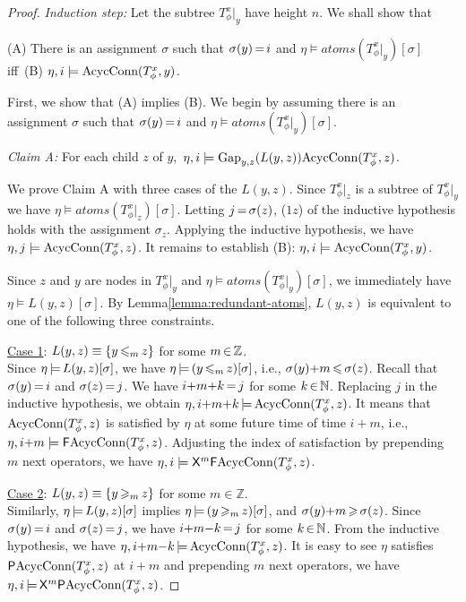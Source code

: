 \begin{proof}
\smallskip

{\em Induction step:}
Let the subtree $T_\phi^x|_y$ have height $n$.
We shall show that

(A) There is an assignment $\sigma$ such that
$\sigma(y)\,{=}\,i$ and
$\eta\models atoms(T_\phi^x|_y)[\sigma]$
\\
iff\,
(B) $\eta,i\models \text{AcycConn}(T_\phi^x,y)$.

\smallskip

First, we show that (A) implies (B).
We begin by
assuming there is an assignment $\sigma$ such that
$\sigma(y)\,{=}\,i$ and
$\eta\models atoms(T_\phi^x|_y)[\sigma]$.

\smallskip

{\sl Claim A:}
For each child $z$ of $y$,\,
$\eta,i\models \text{Gap}_{y,z}(L(y,z))\text{AcycConn}(T_\phi^x,z)$.

We prove Claim A with three cases of the $L(y,z)$.
Since $T_\phi^x|_z$ is a subtree of $T_\phi^x|_y$
we have
$\eta\models atoms(T_\phi^x|_z)[\sigma]$.
Letting $j\,{=}\,\sigma(z)$, ($1z$)
of the inductive hypothesis holds
with the assignment $\sigma_z$.
Applying the inductive hypothesis, 
we have
$\eta,j\models\text{AcycConn}(T_\phi^x,z)$.
It remains to establish (B):
$\eta,i\models\text{AcycConn}(T_\phi^x,y)$.

Since $z$ and $y$ are nodes in $T_\phi^x|_y$ and
$\eta\models atoms(T_\phi^x|_y)[\sigma]$,
we immediately have $\eta\models L(y,z)[\sigma]$.
By Lemma\:\ref{lemma:redundant-atoms},
$L(y,z)$ is equivalent to one of the following three constraints.

\smallskip

\underline{Case 1}:
$L(y,z)\equiv \{y \,{\leqslant_m}\, z\}$ for some $m\,{\in}\,\mathbb{Z}$.
\\
Since $\eta\,{\models}\, L(y,z)[\sigma]$,
we have $\eta\,{\models}\, (y\,{\leqslant_m}\, z)[\sigma]$,
i.e.,
$\sigma(y) {+} m \,{\leqslant}\, \sigma(z)$.
Recall that $\sigma(y)\,{=}\,i$ and $\sigma(z)\,{=}\,j$.
We have $i{+}m{+}k\,{=}\,j$ for some $k\,{\in}\,\mathbb{N}$.
Replacing $j$ in the inductive hypothesis,
we obtain $\eta, i{+}m{+}k \,{\models}\, \text{AcycConn}(T_\phi^x,z)$.
It means that $\text{AcycConn}(T_\phi^x,z)$ is satisfied
by $\eta$ at some future time of time $i{+}m$,
i.e.,
$\eta,i{+}m\models {\sf F}\text{AcycConn}(T_\phi^x,z)$.
Adjusting the index of satisfaction by prepending $m$ next operators,
we have $\eta,i\models {\sf X}^{m}{\sf F}\text{AcycConn}(T_\phi^x,z)$.

\smallskip

\underline{Case 2}:
$L(y,z)\equiv \{y \,{\geqslant_m}\, z\}$ for some $m\in\mathbb{Z}$.
\\
Similarly, $\eta\,{\models}\, L(y,z)[\sigma]$ implies
$\eta\,{\models}\, (y \,{\geqslant_m}\, z)[\sigma]$, and
$\sigma(y) {+} m \,{\geqslant}\, \sigma(z)$.
Since $\sigma(y)\,{=}\,i$ and $\sigma(z)\,{=}\,j$,
we have $i{+}m{-}k\,{=}\,j$ for some $k\,{\in}\,\mathbb{N}$.
From the inductive hypothesis,
we have
$\eta, i{+}m{-}k \,{\models}\, \text{AcycConn}(T_\phi^x,z)$.
It is easy to see
$\eta$ satisfies ${\sf P}\text{AcycConn}(T_\phi^x,z)$ at $i{+}m$
and prepending $m$ next operators, we have
$\eta,i\,{\models}\, {\sf X}^{m}{\sf P}\text{AcycConn}(T_\phi^x,z)$.


\end{proof}
